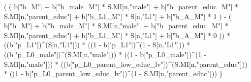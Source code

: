 \documentclass[
]{book}
\newenvironment{Shaded}{\begin{snugshade}}{\end{snugshade}}
\newcommand{\DecValTok}[1]{\textcolor[rgb]{0.00,0.00,0.81}{#1}}
\newcommand{\NormalTok}[1]{#1}
\newcommand{\SpecialCharTok}[1]{\textcolor[rgb]{0.00,0.00,0.00}{#1}}
\newcommand{\StringTok}[1]{\textcolor[rgb]{0.31,0.60,0.02}{#1}}
\begin{document}
\begin{Shaded}
\begin{Highlighting}[]
\NormalTok{      ( ( b[}\StringTok{"b\_M"}\NormalTok{] }\SpecialCharTok{+} 
\NormalTok{            b[}\StringTok{"b\_male\_M"}\NormalTok{] }\SpecialCharTok{*}\NormalTok{ S.MI[n,}\StringTok{"male"}\NormalTok{] }\SpecialCharTok{+} 
\NormalTok{            b[}\StringTok{"b\_parent\_educ\_M"}\NormalTok{] }\SpecialCharTok{*}\NormalTok{ S.MI[n,}\StringTok{"parent\_educ"}\NormalTok{] }\SpecialCharTok{+} 
\NormalTok{            b[}\StringTok{"b\_L1\_M"}\NormalTok{] }\SpecialCharTok{*}\NormalTok{ S[n,}\StringTok{"L1"}\NormalTok{] }\SpecialCharTok{+}
\NormalTok{            b[}\StringTok{"b\_A\_M"}\NormalTok{] }\SpecialCharTok{*} \DecValTok{1}\NormalTok{ ) }\SpecialCharTok{{-}} 
\NormalTok{          ( b[}\StringTok{"b\_M"}\NormalTok{] }\SpecialCharTok{+} 
\NormalTok{              b[}\StringTok{"b\_male\_M"}\NormalTok{] }\SpecialCharTok{*}\NormalTok{ S.MI[n,}\StringTok{"male"}\NormalTok{] }\SpecialCharTok{+} 
\NormalTok{              b[}\StringTok{"b\_parent\_educ\_M"}\NormalTok{] }\SpecialCharTok{*}\NormalTok{ S.MI[n,}\StringTok{"parent\_educ"}\NormalTok{] }\SpecialCharTok{+} 
\NormalTok{              b[}\StringTok{"b\_L1\_M"}\NormalTok{] }\SpecialCharTok{*}\NormalTok{ S[n,}\StringTok{"L1"}\NormalTok{] }\SpecialCharTok{+}
\NormalTok{              b[}\StringTok{"b\_A\_M"}\NormalTok{] }\SpecialCharTok{*} \DecValTok{0}\NormalTok{ )) }\SpecialCharTok{*} 
\NormalTok{      ((b[}\StringTok{"p\_L1"}\NormalTok{])}\SpecialCharTok{\^{}}\NormalTok{(S[n,}\StringTok{"L1"}\NormalTok{])) }\SpecialCharTok{*}
\NormalTok{      ((}\DecValTok{1} \SpecialCharTok{{-}}\NormalTok{ b[}\StringTok{"p\_L1"}\NormalTok{])}\SpecialCharTok{\^{}}\NormalTok{(}\DecValTok{1} \SpecialCharTok{{-}}\NormalTok{ S[n,}\StringTok{"L1"}\NormalTok{])) }\SpecialCharTok{*}
\NormalTok{      ((b[}\StringTok{"p\_L0\_male"}\NormalTok{])}\SpecialCharTok{\^{}}\NormalTok{(S.MI[n,}\StringTok{"male"}\NormalTok{])) }\SpecialCharTok{*} 
\NormalTok{      ((}\DecValTok{1} \SpecialCharTok{{-}}\NormalTok{ b[}\StringTok{"p\_L0\_male"}\NormalTok{])}\SpecialCharTok{\^{}}\NormalTok{(}\DecValTok{1} \SpecialCharTok{{-}}\NormalTok{ S.MI[n,}\StringTok{"male"}\NormalTok{])) }\SpecialCharTok{*} 
\NormalTok{      ((b[}\StringTok{"p\_L0\_parent\_low\_educ\_lv"}\NormalTok{])}\SpecialCharTok{\^{}}\NormalTok{(S.MI[n,}\StringTok{"parent\_educ"}\NormalTok{])) }\SpecialCharTok{*}
\NormalTok{      ((}\DecValTok{1} \SpecialCharTok{{-}}\NormalTok{ b[}\StringTok{"p\_L0\_parent\_low\_educ\_lv"}\NormalTok{])}\SpecialCharTok{\^{}}\NormalTok{(}\DecValTok{1} \SpecialCharTok{{-}}\NormalTok{ S.MI[n,}\StringTok{"parent\_educ"}\NormalTok{])) }
\NormalTok{    \}}
  

\end{Highlighting}
\end{Shaded}
\end{document}
